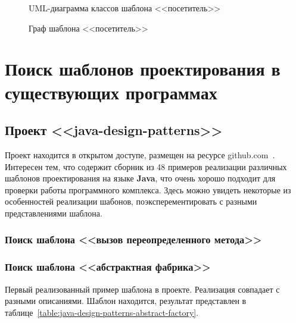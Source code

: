 \begin{figure}[!ht]
\centering
\caption{UML-диаграмма классов шаблона <<посетитель>>}
\label{fig:visitor-uml}
\end{figure}

\begin{figure}[!ht]
\centering
\caption{Граф шаблона <<посетитель>>}
\label{fig:visitor-graph}
\end{figure}

\section{Поиск шаблонов проектирования в существующих программах}

\subsection{Проект <<java-design-patterns>>}

Проект находится в открытом доступе, размещен на ресурсе
github.com~\cite{java-design-patterns}.
Интересен тем, что содержит сборник из 48 примеров реализации различных
шаблонов проектирования на языке \textbf{Java},
что очень хорошо подходит для проверки работы программного комплекса.
Здесь можно увидеть некоторые из особенностей реализации шабонов,
поэксперементировать с разными представлениями шаблона.

\subsubsection{Поиск шаблона <<вызов переопределенного метода>>}

\subsubsection{Поиск шаблона <<абстрактная фабрика>>}

Первый реализованный пример шаблона в проекте.
Реализация совпадает с разными описаниями.
Шаблон находится, результат представлен в таблице~\ref{table:java-design-patterns-abstract-factory}.

